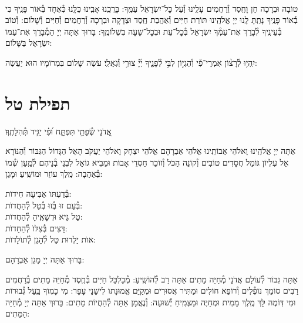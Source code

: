 \documentclass[twoside, openany, parskip=half, 11pt]{book}
\begin{document}
\shatz\\
טוֹבָה וּבְרָכָה חֵן וָחֶֽסֶד וְ֯רַחֲמִים עָלֵֽינוּ וְ֯עַל כׇּל־יִשְׂרָאֵל עַמֶּֽךָ: בָּרֲכֵֽנוּ אָבִֽינוּ כֻּלָּֽנוּ כְּ֯אֶחָד בְּ֯אוֹר פָּנֶֽיךָ כִּי בְ֯אוֹר פָּנֶֽיךָ נָתַֽתָּ לָֽנוּ יְיָ אֱלֹהֵֽינוּ תּוֹרַת חַיִּים וְ֯אַהֲבַת חֶֽסֶד וּצְדָקָה וּבְרָכָה וְ֯רַחֲמִים וְ֯חַיִּים וְ֯שָׁלוֹם: וְ֯טוֹב בְּ֯עֵינֶֽיךָ לְ֯בָרֵךְ אֶת־עַמְּ֯ךָ יִשְׂרָאֵל בְּ֯כׇל־עֵת וּבְכׇל־שָׁעָה בִּשְׁלוֹמֶֽךָ: בָּרוּךְ אַתָּה יְיָ הַמְ֯בָרֵךְ אֶת־עַמּוֹ יִשְׂרָאֵל בַּשָּׁלוֹם:

יִֽהְי֥וּ לְ֯רָצ֨וֹן אִמְרֵי־פִ֡י וְ֯הֶגְי֣וֹן לִבִּ֣י לְ֯פָנֶ֑יךָ יְ֜יָ֗ צוּרִ֥י וְ֯גֹֽאֲלִֽי׃ עֹשֶׂה שָׁלוֹם בִּמְרוֹמָיו הוּא יַעֲשֶׂה:

\vfill

\section[תפילת טל]{ תפילת טל }
\label{tefilastal}


\begin{small}
אֲ֭דֹנָי שְׂ֯פָתַ֣י תִּפְתָּ֑ח וּ֝פִ֗י יַגִּ֥יד תְּ֯הִלָּתֶֽךָ׃
\\
\end{small}
אַתָּה יְיָ אֱלֹהֵֽינוּ וֵאלֹהֵי אֲבוֹתֵֽינוּ אֱלֹהֵי אַבְרָהָם אֱלֹהֵי יִצְחָק וֵאלֹהֵי יַעֲקֹב הָאֵל הַגָּדוֹל הַגִּבּוֹר וְ֯הַנּוֹרָא אֵל עֶלְיוֹן גּוֹמֵל חֲסָדִים טוֹבִים וְ֯קוֹנֵה הַכֹּל וְ֯זוֹכֵר חַסְדֵי אָבוֹת וּמֵבִיא גוֹאֵל לִבְנֵי בְ֯נֵיהֶם לְ֯מַֽעַן שְׁ֯מוֹ בְּ֯אַהֲבָה: מֶֽלֶךְ עוֹזֵר וּמוֹשִֽׁיעַ וּמָגֵן:


\begin{large}
בְּ֯דַעְתּוׂ אַבִּיעָה חִידוׂת: \\
בְּ֯עַם זוּ בְּ֯זוּ בְּ֯טַל לְ֯הַחֲדוׂת:\\
טַל גֵּיא וּדְשָׁאֶֽיהָ לְ֯הַחֲדוׂת: \\
דָּצִים בְּ֯צִלּוׂ לְ֯הֵחָדוׂת:\\
אוׂת יַלְדוּת טַל לְ֯הָגֵן לְ֯תוׂלָדוׂת:

\end{large}


בָּרוּךְ אַתָּה יְיָ מָגֵן אַבְרָהָם:

אַתָּה גִּבּוֹר לְ֯עוֹלָם אֲדֹנָי מְ֯חַיֵּה מֵתִים אַתָּה רַב לְ֯הוֹשִֽׁיעַ: מְ֯כַלְכֵּל חַיִּים בְּ֯חֶֽסֶד מְ֯חַיֵּה מֵתִים בְּ֯רַחֲמִים רַבִּים סוֹמֵךְ נוֹפְ֯לִים וְ֯רוֹפֵא חוֹלִים וּמַתִּיר אֲסוּרִים וּמְקַיֵּם אֱמוּנָתוֹ לִישֵׁנֵי עָפָר: מִי כָמֽוֹךָ בַּֽעַל גְּ֯בוּרוֹת וּמִי דּֽוֹמֶה לָּךְ מֶֽלֶךְ מֵמִית וּמְחַיֶּה וּמַצְמִֽיחַ יְ֯שׁוּעָה: וְ֯נֶאֱמָן אַתָּה לְ֯הַחֲיוֹת מֵתִים: בָּרוּךְ אַתָּה יְיָ מְ֯חַיֵּה הַמֵּתִים:
\end{document}
